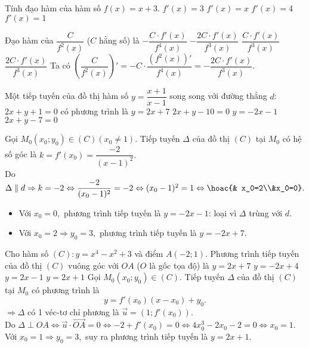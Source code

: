 \begin{ex}%
	Tính đạo hàm của hàm số $f(x)=x+3$.
	\choice
	{$f'(x)=3$}
	{$f'(x)=x$}
	{$f'(x)=4$}
	{\True $f'(x)=1$}
\end{ex}

\begin{ex}%
	Đạo hàm của $\dfrac{C}{f^2(x)} $ ($C$ hằng số) là
	\choice
	{ $- \dfrac{C\cdot f'(x)}{f^4(x)}$}
	{\True $- \dfrac{2C\cdot f'(x)}{f^3(x)}$}
	{ $\dfrac{C\cdot f'(x)}{f^3(x)}$}
	{$\dfrac{2C\cdot f'(x)}{f^3(x)}$}
	\loigiai
	{ Ta có $\left(\dfrac{C}{f^2(x)} \right)' = - C\cdot \dfrac{\left( f^2(x)\right)'}{f^4(x)}= - \dfrac{2C\cdot f'(x)}{f^3(x)}.$
	}
\end{ex}

\begin{ex}%
	Một tiếp tuyến của đồ thị hàm số $ y=\dfrac{x+1}{x-1}$ song song với đường thẳng $d$: $2x+y+1=0$ có phương trình là
	\choice
	{$y=2x+7$}
	{$2x+y-10=0$}
	{$y=-2x-1$}
	{\True $2x+y-7=0$}
	\loigiai
	{ Gọi $M_0(x_0;y_0) \in (C) (x_0 \neq 1)$. Tiếp tuyến $ \Delta $ của đồ thị $(C)$ tại $M_0$ có hệ số góc là $k =f'(x_0)= \dfrac{-2}{(x-1)^2}.$\\
		Do $ \Delta \parallel d \Rightarrow  k= -2 \Leftrightarrow \dfrac{-2}{(x_0-1)^2}=-2 \Leftrightarrow (x_0-1)^2=1 \Leftrightarrow \hoac{& x_0=2\\&x_0=0}.$\\
		\begin{itemize}
			\item Với $x_0=0,$ phương trình tiếp tuyến là $y=-2x-1$: loại vì $\Delta$ trùng với $d$.
			\item Với $x_0 =2 \Rightarrow y_0=3,$ phương trình tiếp tuyến là $y=-2x +7.$
		\end{itemize}
		
	}
\end{ex}

\begin{ex}%
	Cho hàm số $(C): y=x^4-x^2+3$ và điểm $A(-2;1)$. Phương trình tiếp tuyến của đồ thị $(C)$ vuông góc với $OA$ ($O$ là gốc tọa độ) là
	\choice
	{$y=2x+7$}
	{$y=-2x+4$}
	{$y=2x-1$}
	{\True $y=2x+1$}
	\loigiai
	{ 	 Gọi $M_0(x_0;y_0) \in (C) $. Tiếp tuyến $ \Delta $ của đồ thị $(C)$ tại $M_0$ có phương trình là $$y =f'(x_0)(x-x_0)+y_0.$$ $\Rightarrow \Delta $ có 1 véc-tơ chỉ phương là $\vec{u}=\left( 1; f'(x_0)\right).$\\
		Do $\Delta \perp OA \Leftrightarrow \vec{u}\cdot \vec{OA} =0  \Leftrightarrow -2+f'(x_0)=0 \Leftrightarrow 4x_0^3-2x_0 -2=0 \Leftrightarrow x_0=1.$\\
		Với $x_0=1 \Rightarrow y_0=3,$ suy ra phương trình tiếp tuyến là $y=2x+1.$
	}
\end{ex}

